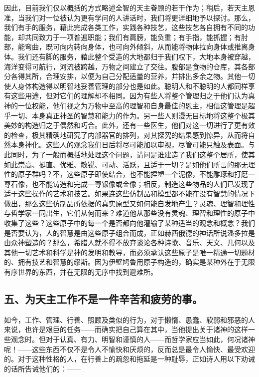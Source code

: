 因此，目前我们仅以概括的方式略述全智的天主眷顾的若干作为；稍后，若天主恩准，当我们对一位被认为更有学问的人讲话时，我们将更详细地予以探讨。那么，我们有手的服务，藉此完成各类工作，实践各种技艺，这些技艺各自拥有不同的功能，却共同致力于一项普遍职能；我们有肩膀，能负重；有手指，能抓握；有肘部，能弯曲，既可向内转向身体，也可向外倾斜，从而能将物体拉向身体或推离身体。我们还有脚的服务，藉此整个受造的大地都归于我们权下，大地本身被穿越，海洋变得可航行，河流被跨越，万物之间建立了交往。腹部是食物的仓库，其各部分各得其所，合理安排，以便为自己分配适量的营养，并排出多余之物。其他一切使人身体构造得以明智地妥善管理的部分也是如此。聪明人和不聪明的人都同样享有这些用途，但对它们的理解却不相同。因为有些人将整个管理归之于他们认为真神的一位权能，他们视之为万物中至高的理智和自身最佳的恩主，相信这管理是超乎一切、本身真正神圣的智慧和能力的作为。另一些人则漫无目标地将这整个极其美妙的构造归之于偶然和巧合。此外，还有一些医生，他们对这一切进行了更有效的检查，极其精确地研究了内部器官的排列，对其探究的结果感到惊异，从而将自然本身神化。这些人的观念我们日后将尽可能加以审视，尽管可能只触及表面。与此同时，为了一般而概括地处理这个问题，请问是谁建造了我们这整个居所，使其如此崇高、挺直、优雅、敏锐、可动、活跃，且适于一切？是如他们所言的那无理性的原子群吗？不，这些原子即使结合，也不能捏塑一个泥像，不能雕琢和打磨一尊石像，也不能铸造和完成一尊银像或金像；相反，制造这些物品的人们已发现了适于这些操作的艺术和技艺。如果连这些仿制品和模型都不能在没有智慧的情况下做出，那么这些仿制品所依据的真实原型又如何能自发地产生？灵魂、理智和理性与哲学家一同出生，它们从何而来？难道他从那些没有灵魂、理智和理性的原子中收集了这些？这些原子中的每一个是否都向他灌输了某种适当的观念和概念？我们是否要认为，人的智慧是由这些原子组合而成，正如赫西俄德的神话所说潘多拉是由众神塑造的？那么，希腊人就不得不放弃谈论各种诗歌、音乐、天文、几何以及其他一切艺术和科学是神的发明和教导，而必须承认这些原子是唯一精通一切题材的、拥有技艺和智慧的缪斯。因为伊壁鸠鲁用原子构造的，确实是某种外在于无限有序世界的东西，并在无限的无序中找到避难所。\par


\subsection{五、为天主工作不是一件辛苦和疲劳的事。}

如今，工作、管理、行善、照顾及类似的行为，对于懒惰、愚蠢、软弱和邪恶的人来说，也许是艰巨的任务——而确实把自己算在其中，当他提出关于诸神的这样一些观念时。但对于认真、有力、明智和谨慎的人——而哲学家应当如此，何况诸神呢！——这些东西不仅不是令人不愉快和厌烦的，反而总是最令人愉快、最受欢迎的。对于这种性格的人，在行善上的疏忽和拖延是一种耻辱，正如诗人用以下劝诫的话所告诫他们的：——\par

